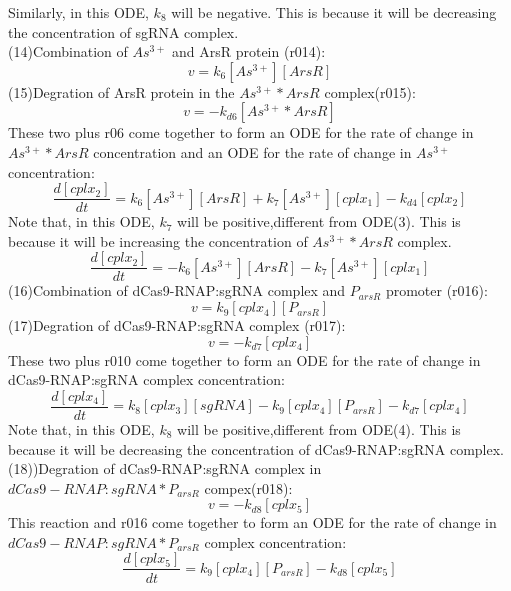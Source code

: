Similarly, in this ODE, $k_8$ will be negative. This is because it will be decreasing the concentration of sgRNA complex.\\
(14)Combination of $As^{3+}$ and ArsR protein (r014):
\begin{displaymath}
v=k_{6}[As^{3+}][ArsR]
\end{displaymath}
(15)Degration of ArsR protein in the  $As^{3+}*ArsR$ complex(r015):
\begin{displaymath}
v=-k_{d6}[As^{3+}*ArsR]
\end{displaymath}
These two plus r06 come together to form an ODE for the rate of change in $As^{3+}*ArsR$  concentration and an ODE for the rate of change in $As^{3+}$ concentration:
\begin{equation}
\frac{d[cplx_2]}{dt}=k_{6}[As^{3+}][ArsR]+k_7[As^{3+}][cplx_1]-k_{d4}[cplx_2] \tag{6}
\end{equation}
Note that, in this ODE, $k_7$ will be positive,different from ODE(3). This is because it will be increasing the concentration of  $As^{3+}*ArsR$ complex.\\
\begin{equation}
\frac{d[cplx_2]}{dt}=-k_{6}[As^{3+}][ArsR]-k_7[As^{3+}][cplx_1] \tag{7}
\end{equation}
(16)Combination of dCas9-RNAP:sgRNA complex and $P_{arsR}$ promoter (r016):
\begin{displaymath}
v=k_{9}[cplx_4][P_{arsR}]
\end{displaymath}
(17)Degration of dCas9-RNAP:sgRNA complex (r017): 
\begin{displaymath}
v=-k_{d7}[cplx_4]
\end{displaymath}
These two plus r010 come together to form an ODE for the rate of change in dCas9-RNAP:sgRNA complex concentration:
\begin{equation}
\frac{d[cplx_4]}{dt}=k_{8}[cplx_3][sgRNA]-k_{9}[cplx_4][P_{arsR}]-k_{d7}[cplx_4]\tag{8}
\end{equation}
Note that, in this ODE, $k_8$ will be positive,different from ODE(4). This is because it will be decreasing the concentration of dCas9-RNAP:sgRNA complex.\\
(18))Degration of dCas9-RNAP:sgRNA complex in $dCas9-RNAP:sgRNA*P_{arsR}$ compex(r018):
\begin{displaymath}
v=-k_{d8}[cplx_5]
\end{displaymath}
This reaction and r016 come together to form an ODE for the rate of change in $dCas9-RNAP:sgRNA*P_{arsR}$ complex concentration:
\begin{equation}
\frac{d[cplx_5]}{dt}=k_{9}[cplx_4][P_{arsR}]-k_{d8}[cplx_5]\tag{9}
\end{equation} 
